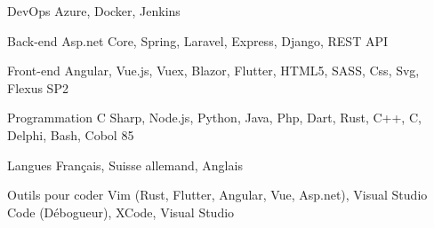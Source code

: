 

\begin{cvskills}

  \cvskill
    {DevOps} %
    {Azure, Docker, Jenkins} %

  \cvskill
    {Back-end} %
    {Asp.net Core, Spring, Laravel, Express, Django, REST API} %

  \cvskill
    {Front-end} %
    {Angular, Vue.js, Vuex, Blazor, Flutter, HTML5, SASS, Css, Svg, Flexus SP2} %

  \cvskill
    {Programmation} %
    {C Sharp, Node.js, Python, Java, Php, Dart, Rust, C++, C, Delphi, Bash, Cobol 85} %

  \cvskill
    {Langues} %
    {Français, Suisse allemand, Anglais} %

  \cvskill
    {Outils pour coder} %
    {Vim (Rust, Flutter, Angular, Vue, Asp.net), Visual Studio Code (Débogueur), XCode, Visual Studio} %

\end{cvskills}
